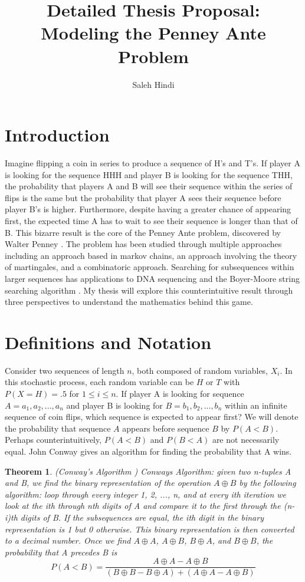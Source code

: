 \documentclass{article}
\newtheorem{theorem}{Theorem}[section]
\numberwithin{mytheorem}{subsection} %
\begin{document}
	\title{Detailed Thesis Proposal: Modeling the Penney Ante Problem}
	\author{Saleh Hindi}

	\maketitle

	\section{Introduction}
		Imagine flipping a coin in series to produce a sequence of H's and T's. If player A is looking for the sequence HHH and player B is looking for the sequence THH, the probability that players A and B will see their sequence within the series of flips is the same but the probability that player A sees their sequence before player B's is higher. Furthermore, despite having a greater chance of appearing first, the expected time A has to wait to see their sequence is longer than that of B. This bizarre result is the core of the Penney Ante problem, discovered by Walter Penney \cite{gardner}. The problem has been studied through multiple approaches including an approach based in markov chains, an approach involving the theory of martingales, and a combinatoric approach. Searching for subsequences within larger sequences has applications to DNA sequencing and the Boyer-Moore string searching algorithm \cite{boyer}. My thesis will explore this counterintuitive result through three perspectives to understand the mathematics behind this game. 

	\section{Definitions and Notation}
		Consider two sequences of length $n$, both composed of random variables, $X_i$. In this stochastic process, each random variable can be $H$ or $T$ with $P(X = H) = .5$ for $1 \leq i \leq n$. If player A is looking for sequence $A = a_1, a_2, ..., a_n$ and player B is looking for $B=b_1, b_2, ..., b_n$ within an infinite sequence of coin flips, which sequence is expected to appear first? We will denote the probability that sequence $A$ appears before sequence $B$ by $P(A < B)$. Perhaps counterintuitively, $P(A < B)$ and $P(B < A)$ are not necessarily equal. John Conway gives an algorithm for finding the probability that A wins. 

		\begin{theorem}(Conway's Algorithm \cite{gardner})
		Conways Algorithm: given two n-tuples A and B, we find the binary representation of the operation $A \oplus B$ by the following algorithm: loop through every integer 1, 2, ..., n, and at every  ith iteration we look at the ith through nth digits of A and compare it to the first through the (n-i)th digits of B. If the subsequences are equal, the ith digit in the binary representation is 1 but 0 otherwise. This binary representation is then converted to a decimal number. Once we find $A \oplus A$, $A \oplus B$, $B \oplus A$, and $B \oplus B$, the probability that A precedes B is $$P(A < B) =\frac{A \oplus A - A \oplus B}{(B \oplus B - B \oplus A) + (A \oplus A - A \oplus B)} $$
		\end{theorem}
\end{document}
